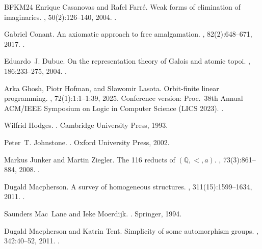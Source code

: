 \documentclass{lmcs}
\begin{document}
\begin{thebibliography}{BFKM24}
Enrique Casanovas and Rafel Farr\'e.
\newblock Weak forms of elimination of imaginaries.
, 50(2):126--140, 2004.
\newblock \href {https://doi.org/10.1002/malq.200310083}
  {}.

Gabriel Conant.
\newblock An axiomatic approach to free amalgamation.
, 82(2):648--671, 2017.
\newblock \href {https://doi.org/10.1017/jsl.2016.42}
  {}.

Eduardo~J. Dubuc.
\newblock On the representation theory of {G}alois and atomic topoi.
, 186:233--275, 2004.
\newblock \href {https://doi.org/10.1016/S0022-4049(03)00141-5}
  {}.

Arka Ghosh, Piotr Hofman, and S{\l}awomir Lasota.
\newblock Orbit-finite linear programming.
, 72(1):1:1--1:39, 2025.
\newblock Conference version: Proc.\ 38th Annual ACM/IEEE Symposium on Logic in
  Computer Science (LICS 2023).
\newblock \href {https://doi.org/10.1145/3703909} {}.

Wilfrid Hodges.
.
\newblock Cambridge University Press, 1993.

Peter~T. Johnstone.
.
\newblock Oxford University Press, 2002.

Markus Junker and Martin Ziegler.
\newblock The 116 reducts of $(\mathbb{Q},<,a)$.
, 73(3):861--884, 2008.
\newblock \href {https://doi.org/10.2178/jsl/1230396752}
  {}.

Dugald Macpherson.
\newblock A survey of homogeneous structures.
, 311(15):1599--1634, 2011.
\newblock \href {https://doi.org/10.1016/j.disc.2011.01.024}
  {}.

Saunders Mac~Lane and Ieke Moerdijk.
.
\newblock Springer, 1994.

Dugald Macpherson and Katrin Tent.
\newblock Simplicity of some automorphism groups.
, 342:40--52, 2011.
\newblock \href {https://doi.org/10.1016/j.jalgebra.2011.05.021}
  {}.


\end{thebibliography}
\end{document}
